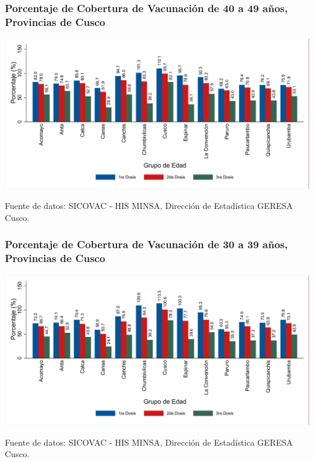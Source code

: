 \documentclass[xcolor=table]{beamer}
\begin{document}
\begin{frame}[label=vacunas_50]
	\frametitle{Porcentaje de Cobertura de Vacunación de 40 a 49 años, Provincias de Cusco}
	\vspace{-.5cm}
	\begin{center}
		\includegraphics[width=1.0\linewidth, trim={.2cm .5cm .2cm .2cm},clip]{../figuras/vacunacion_provincial_edad_practica_5.pdf}
	\end{center}
	{\tiny Fuente de datos: SICOVAC - HIS MINSA, Dirección de Estadística GERESA Cusco. \\}
\hyperlink{cobertura_vacuna_provincias}{}
\end{frame}

\begin{frame}[label=vacunas_40]
	\frametitle{Porcentaje de Cobertura de Vacunación de 30 a 39 años, Provincias de Cusco}
	\vspace{-.5cm}
	\begin{center}
		\includegraphics[width=1.0\linewidth, trim={.2cm .5cm .2cm .2cm},clip]{../figuras/vacunacion_provincial_edad_practica_4.pdf}
	\end{center}
	{\tiny Fuente de datos: SICOVAC - HIS MINSA, Dirección de Estadística GERESA Cusco. \\}
\hyperlink{cobertura_vacuna_provincias}{}
\end{frame}
\end{document}
